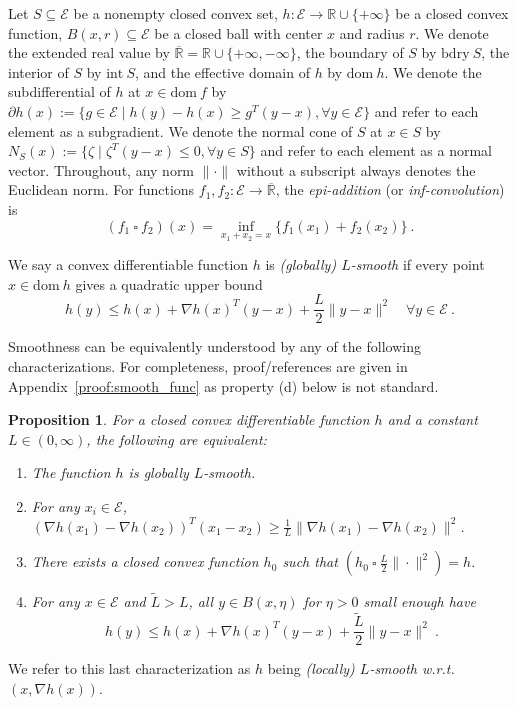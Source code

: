 \documentclass[sn-mathphys,Numbered]{sn-jnl}%
\newcommand{\bdry}{\mathrm{bdry\ }}
\newtheorem{proposition}[theorem]{Proposition}%
\begin{document}
Let $S\subseteq \mathcal{E}$ be a nonempty closed convex set, $h: \mathcal{E} \rightarrow \mathbb{R} \cup \{+\infty\}$ be a closed convex function, $B(x,r)\subseteq \mathcal{E}$ be a closed ball with center $x$ and radius $r$. We denote the extended real value by $\mathbb{\overline R} = \mathbb{R} \cup \{+\infty, -\infty\}$, the boundary of $S$ by $\bdry S$, the interior of $S$ by $\mathrm{int\ }S$, and the effective domain of $h$ by $\mathrm{dom\ }h$. We denote the subdifferential of $h$ at $x\in \mathrm{dom\ }f$ by $\partial h(x) :=\{g \in \mathcal{E} \mid h(y)-h(x) \geq g^T(y-x), \forall y \in \mathcal{E} \}$ and refer to each element as a subgradient. We denote the normal cone of $S$ at $x\in S$ by $N_S(x):= \{\zeta \mid \zeta^T(y-x) \leq 0, \forall y \in S\}$ and refer to each element as a normal vector. Throughout, any norm $\|\cdot\|$ without a subscript always denotes the Euclidean norm.
For functions $f_1, f_2: \mathcal{E} \rightarrow \mathbb{\overline R}$, the {\it epi-addition} (or {\it inf-convolution}) is
$$ (f_1 \ \square\ f_2)(x)=\inf_{x_1+x_2=x} \{f_1(x_1)+f_2(x_2)\} \ .
$$

We say a convex differentiable function $h$ is {\it (globally) $L$-smooth} if every point $x\in\mathrm{dom\ }h$ gives a quadratic upper bound
$$ h(y) \leq h(x) + \nabla h(x)^T(y-x) + \frac{L}{2}\|y-x\|^2 \quad \forall y\in\mathcal{E} \ . $$

Smoothness can be equivalently understood by any of the following characterizations. For completeness, proof/references are given in Appendix~\ref{proof:smooth_func} as property (d) below is not standard.
\begin{proposition} \label{prop:smooth_func}
    For a closed convex differentiable function $h$ and a constant $L\in (0,\infty)$, the following are equivalent:
    \begin{enumerate}[label=(\alph*)]
    \item The function $h$ is globally $L$-smooth.
    \item For any $x_i \in \mathcal{E}$, $ (\nabla h(x_1)-\nabla h(x_2))^T(x_1-x_2)\geq \frac{1}{L}\|\nabla h(x_1)-\nabla h(x_2)\|^2 $.
    \item There exists a closed convex function $h_0$ such that $(h_0\  \square\ \frac{L}{2}\|\cdot\|^2 )= h$.
    \item For any $x\in\mathcal{E}$ and $\tilde L > L$, all $y\in B(x,\eta)$ for $\eta>0$ small enough have
    $$ h(y) \leq h(x) + \nabla h(x)^T(y-x) + \frac{\tilde L}{2}\|y-x\|^2 \ . $$
    \end{enumerate}
\end{proposition}
\noindent We refer to this last characterization as $h$ being {\it (locally) $L$-smooth w.r.t.~$(x,\nabla h(x))$}.
\end{document}

